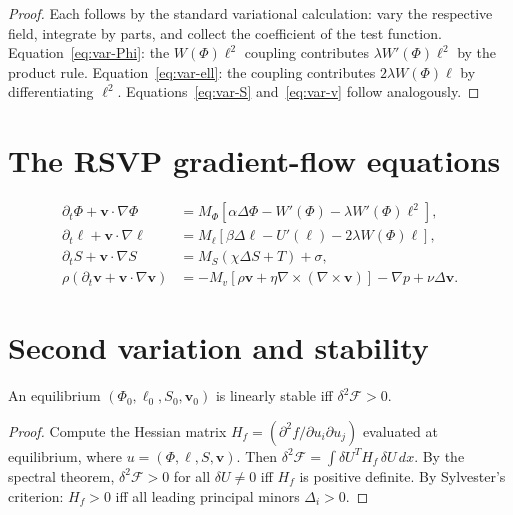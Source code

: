 \begin{proof}
  Each follows by the standard variational calculation:
  vary the respective field, integrate by parts, and collect
  the coefficient of the test function.
  Equation~\eqref{eq:var-Phi}: the $W(\Phi)\ell^2$ coupling
  contributes $\lambda W'(\Phi)\ell^2$ by the product rule.
  Equation~\eqref{eq:var-ell}: the coupling contributes
  $2\lambda W(\Phi)\ell$ by differentiating $\ell^2$.
  Equations~\eqref{eq:var-S} and~\eqref{eq:var-v} follow
  analogously.
\end{proof}

\section{The RSVP gradient-flow equations}

\begin{definition}
  \label{def:rsvp-gf-full}
  \begin{align*}
    \partial_t\Phi + \mathbf{v}\cdot\nabla\Phi
    &= M_\Phi[\alpha\Delta\Phi - W'(\Phi) - \lambda W'(\Phi)\ell^2],\\
    \partial_t\ell + \mathbf{v}\cdot\nabla\ell
    &= M_\ell[\beta\Delta\ell - U'(\ell) - 2\lambda W(\Phi)\ell],\\
    \partial_t S + \mathbf{v}\cdot\nabla S
    &= M_S(\chi\Delta S + T) + \sigma,\\
    \rho(\partial_t\mathbf{v} + \mathbf{v}\cdot\nabla\mathbf{v})
    &= -M_v[\rho\mathbf{v} + \eta\nabla\times(\nabla\times\mathbf{v})]
      - \nabla p + \nu\Delta\mathbf{v}.
  \end{align*}
\end{definition}

\section{Second variation and stability}

\begin{theorem}
  \label{thm:stability-2nd-var}
  \statusproven{}
  An equilibrium $(\Phi_0,\ell_0,S_0,\mathbf{v}_0)$ is
  linearly stable iff $\delta^2\mathcal{F} > 0$.
\end{theorem}

\begin{proof}
  Compute the Hessian matrix $H_f = (\partial^2 f/\partial u_i\partial u_j)$
  evaluated at equilibrium, where $u = (\Phi,\ell,S,\mathbf{v})$.
  Then $\delta^2\mathcal{F} = \int \delta U^T H_f\,\delta U\,dx$.
  By the spectral theorem, $\delta^2\mathcal{F} > 0$ for all
  $\delta U \neq 0$ iff $H_f$ is positive definite.
  By Sylvester's criterion: $H_f > 0$ iff all leading principal
  minors $\Delta_i > 0$.
\end{proof}


